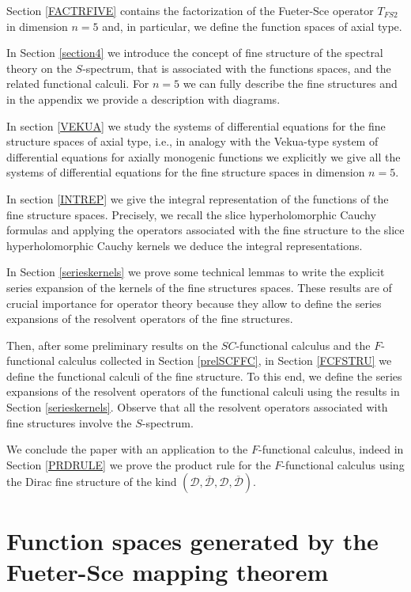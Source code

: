 \documentclass[reqno,11pt]{amsart}
\numberwithin{equation}{section}
\theoremstyle{definition}
\begin{document}
Section \ref{FACTRFIVE} contains the factorization of the Fueter-Sce operator  $T_{FS2}$ in dimension $n=5$
and, in particular, we define the function spaces of axial type.

In Section \ref{section4} we introduce the concept of  fine structure of the spectral theory on the $S$-spectrum,
that is associated with the functions spaces, and the related functional calculi.
For $n=5$ we can fully describe the fine structures and in the appendix
 we provide a description with diagrams.

In section \ref{VEKUA} we study the systems of differential equations for the fine structure spaces of axial type, i.e.,
in  analogy with the Vekua-type system of differential equations for axially monogenic functions
we explicitly we give all the systems of differential equations for the fine structure spaces in dimension $n=5$.


In section \ref{INTREP} we give the integral representation of the functions of the fine structure spaces.
Precisely, we recall the slice hyperholomorphic Cauchy formulas
and applying the operators associated with the fine structure to the slice hyperholomorphic Cauchy kernels we
deduce the integral representations.



In Section \ref{serieskernels} we prove some technical lemmas to write the explicit
series expansion of the kernels of the fine structures spaces.
These results are of crucial importance for operator theory because they allow to define the series expansions of the resolvent
operators of the fine structures.

Then, after some preliminary results on the $SC$-functional calculus and the $F$-functional calculus  collected in Section \ref{prelSCFFC}, in Section \ref{FCFSTRU} we define the functional calculi of the fine structure. To this end,
 we define the
series expansions of the resolvent operators of the  functional calculi using the results in Section \ref{serieskernels}.
Observe that all the resolvent operators associated with fine structures involve the $S$-spectrum.

We conclude the paper with an application to the $F$-functional calculus, indeed in Section \ref{PRDRULE} we prove
the product rule for the $F$-functional calculus using the Dirac fine structure of the kind $(\mathcal{D}, \mathcal{\overline{D}}, \mathcal{D}, \mathcal{\overline{D}} )$.



\section{Function spaces generated by the Fueter-Sce mapping theorem}\label{FSPAC}
\end{document}
